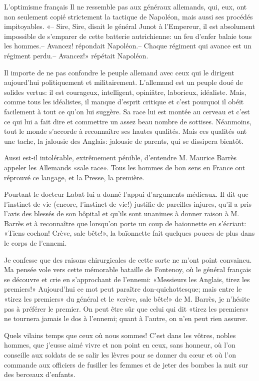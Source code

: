 \begin{chapter}{L'optimisme français}
Il ne ressemble pas aux généraux allemands, qui, eux, ont non seulement
copié strictement la tactique de Napoléon, mais aussi ses procédés
impitoyables. «-- Sire, Sire, disait le général Junot à l'Empereur, il
est absolument impossible de s'emparer de cette batterie autrichienne:
un feu d'enfer balaie tous les hommes.-- Avancez! répondait
Napoléon.-- Chaque régiment qui avance est un régiment perdu.-- Avancez!»
répétait Napoléon.

Il importe de ne pas confondre le peuple allemand avec ceux qui le
dirigent aujourd'hui politiquement et militairement. L'allemand est un
peuple doué de solides vertus: il est courageux, intelligent,
opiniâtre, laborieux, idéaliste. Mais, comme tous les idéalistes, il
manque d'esprit critique et c'est pourquoi il obéit facilement à tout ce
qu'on lui suggère. Sa race lui est montée au cerveau et c'est ce qui lui
a fait dire et commettre un assez beau nombre de sottises. Néanmoins,
tout le monde s'accorde à reconnaître ses hautes qualités. Mais ces
qualités ont une tache, la jalousie des Anglais: jalousie de parents,
qui se dissipera bientôt.

Aussi est-il intolérable, extrêmement pénible, d'entendre M. Maurice
Barrès appeler les Allemands «sale race». Tous les hommes de bon sens en
France ont réprouvé ce langage, et la Presse, la première.

Pourtant le docteur Labat lui a donné l'appui d'arguments médicaux. Il
dit que l'instinct de vie (encore, l'instinct de vie!) justifie de
pareilles injures, qu'il a pris l'avis des blessés de son hôpital et
qu'ils sont unanimes à donner raison à M. Barrès et à reconnaître que
lorsqu'on porte un coup de baïonnette en s'écriant: «Tiens cochon!
Crève, sale bête!», la baïonnette fait quelques pouces de plus dans le
corps de l'ennemi.

Je confesse que des raisons chirurgicales de cette sorte ne m'ont point
convaincu. Ma pensée vole vers cette mémorable bataille de Fontenoy, où
le général français se découvre et crie en s'approchant de l'ennemi:
«Messieurs les Anglais, tirez les premiers!» Aujourd'hui ce mot peut
paraître don-quichottesque; mais entre le «tirez les premiers» du
général et le «crève, sale bête!» de M. Barrès, je n'hésite pas à
préférer le premier. On peut être sûr que celui qui dit «tirez les
premiers» ne tournera jamais le dos à l'ennemi; quant à l'autre, on n'en
peut rien assurer.

Quels vilains temps que ceux où nous sommes! C'est dans les vôtres,
nobles hommes, que j'eusse aimé vivre et non point en ceux, sans
honneur, où l'on conseille aux soldats de se salir les lèvres pour se
donner du cœur et où l'on commande aux officiers de fusiller les
femmes et de jeter des bombes la nuit sur des berceaux d'enfants.

\end{chapter}

